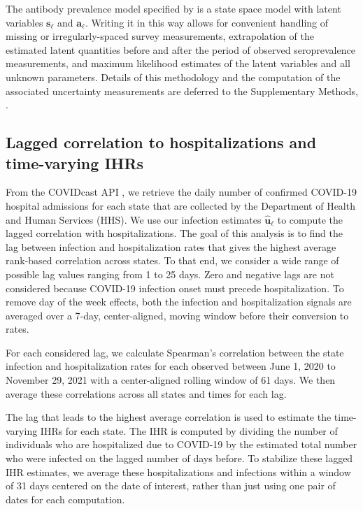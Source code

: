     
The antibody prevalence model specified by
 is a state space model with
latent variables $\mathbf{s}_{\ell}$ and $\mathbf{a}_{\ell}$. Writing it in this
way allows for convenient handling of missing or irregularly-spaced survey
measurements, extrapolation of the estimated latent quantities before and after
the period of observed seroprevalence measurements, and maximum likelihood
estimates of the latent variables and all unknown parameters. Details of
this methodology and the computation of the associated uncertainty measurements
are deferred to the Supplementary Methods, .



\subsection{Lagged correlation to hospitalizations and time-varying IHRs} 
\label{sec:ihr-calculations}

From the COVIDcast API \citep{reinhart2021open}, we retrieve the daily number of
confirmed COVID-19 hospital admissions for each state that are collected by the
\US Department of Health and Human Services (HHS). We use our infection
estimates $\mathbf{\widehat{u}}_\ell$ to compute the lagged correlation with 
hospitalizations. The goal of this analysis is to find the lag between
infection and hospitalization rates that gives the highest average rank-based
correlation across \US states. To that end, we consider a wide range of possible
lag values ranging from 1 to 25 days. Zero and negative lags are not considered
because COVID-19 infection onset must precede hospitalization.
To remove day of the week effects, both the infection and hospitalization
signals are averaged over a 7-day, center-aligned, moving window before their
conversion to rates.

For each considered lag, we calculate Spearman's correlation between the state
infection and hospitalization rates for each observed between June 1, 2020 to
November 29, 2021 with a center-aligned rolling window of 61 days. We then
average these correlations across all states and times for each lag. 

The lag that leads to the highest average correlation is used to estimate the
time-varying IHRs for each state. The IHR is computed by dividing the number of
individuals who are hospitalized due to COVID-19 by the estimated total number
who were infected on the lagged number of days before. To stabilize these lagged
IHR estimates, we average these hospitalizations and infections within a window
of 31 days centered on the date of interest, rather than just using one pair of
dates for each computation.
